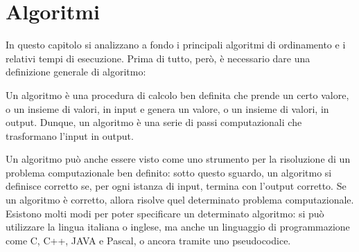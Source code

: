 \chapter{Algoritmi}
In questo capitolo si analizzano a fondo i principali algoritmi di ordinamento e i relativi tempi di esecuzione. Prima di tutto, però, è necessario dare una definizione generale di algoritmo:

\begin{definition}
  Un algoritmo è una procedura di calcolo ben definita che prende un certo valore, o un insieme di valori, in input e genera un valore, o un insieme di valori, in output. Dunque, un algoritmo è una serie di passi computazionali che trasformano l'input in output.
\end{definition}

Un algoritmo può anche essere visto come uno strumento per la risoluzione di un problema computazionale ben definito: sotto questo sguardo, un algoritmo si definisce corretto se, per ogni istanza di input, termina con l'output corretto. Se un algoritmo è corretto, allora risolve quel determinato problema computazionale. Esistono molti modi per poter specificare un determinato algoritmo: si può utilizzare la lingua italiana o inglese, ma anche un linguaggio di programmazione come C, C++, JAVA e Pascal, o ancora tramite uno pseudocodice.

